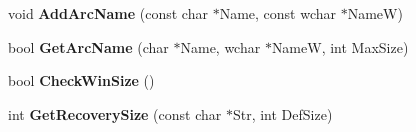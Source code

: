 \begin{DoxyCompactItemize}
\item 
\hypertarget{class_command_data_aa4ac3e304700100b5fa68fce8eec5c92}{void {\bfseries Add\-Arc\-Name} (const char $\ast$Name, const wchar $\ast$Name\-W)}\label{class_command_data_aa4ac3e304700100b5fa68fce8eec5c92}

\item 
\hypertarget{class_command_data_a138b2c28820fa4007a963f573b7867c3}{bool {\bfseries Get\-Arc\-Name} (char $\ast$Name, wchar $\ast$Name\-W, int Max\-Size)}\label{class_command_data_a138b2c28820fa4007a963f573b7867c3}

\item 
\hypertarget{class_command_data_a9dcc3420dd5e7147d1e3e227727da477}{bool {\bfseries Check\-Win\-Size} ()}\label{class_command_data_a9dcc3420dd5e7147d1e3e227727da477}

\item 
\hypertarget{class_command_data_ad2e5c2f3c7f9673657f344d4791d7544}{int {\bfseries Get\-Recovery\-Size} (const char $\ast$Str, int Def\-Size)}\label{class_command_data_ad2e5c2f3c7f9673657f344d4791d7544}

\end{DoxyCompactItemize}
